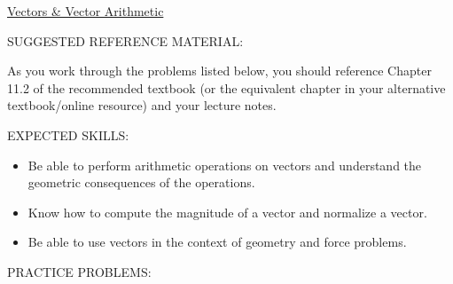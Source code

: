 \documentclass[12pt]{article}
\begin{document}
\begin{center}
\underline{\LARGE{Vectors \& Vector Arithmetic}}
\end{center}

\noindent SUGGESTED REFERENCE MATERIAL:

\bigskip

\noindent As you work through the problems listed below, you should reference Chapter 11.2 of the recommended textbook (or the equivalent chapter in your alternative textbook/online resource) and your lecture notes.

\bigskip

\noindent EXPECTED SKILLS:

\begin{itemize}

\item Be able to perform arithmetic operations on vectors and understand the geometric consequences of the operations. 

\item Know how to compute the magnitude of a vector and normalize a vector. 

\item Be able to use vectors in the context of geometry and force problems.

\end{itemize}

\noindent PRACTICE PROBLEMS:

\medskip
\end{document}
